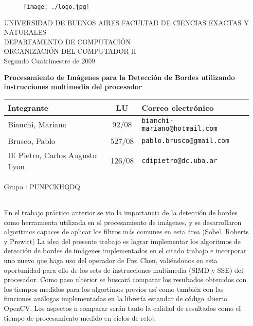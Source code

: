 \documentclass[11pt, a4paper]{article}
\begin{document}
\begin{figure}[t] %
\centering
\texttt{[image: ./logo.jpg]}
\end{figure}


\begin{center}


\LARGE{UNIVERSIDAD DE BUENOS AIRES}
\Large{FACULTAD DE CIENCIAS EXACTAS Y NATURALES\\
DEPARTAMENTO DE COMPUTACI\'ON\\
\vspace{1.5cm}
ORGANIZACI\'ON DEL COMPUTADOR II\\
Segundo Cuatrimestre de 2009}

\vskip 50pt
\textbf{\Large{Procesamiento de Im\'agenes para la Detecci\'on de Bordes utilizando instrucciones multimedia del procesador}}

\end{center}

\vskip 30pt

\begin{center}
\begin{tabular}{|lcl|}
\hline Integrante & LU & Correo electr\'onico \\
\hline Bianchi, Mariano & 92/08 & \texttt{bianchi-mariano@hotmail.com}\\
Brusco, Pablo & 527/08 & \texttt{pablo.brusco@gmail.com} \\
Di Pietro, Carlos Augusto Lyon & 126/08 & \texttt{cdipietro@dc.uba.ar}\\
\hline
\end{tabular}

\vspace{20 pt}

Grupo : PUNPCKHQDQ

\end{center}

\vskip 15pt

{\small\textbf{}\\
En el trabajo pr\'actico anterior se vio la importancia de la detecci\'on de bordes como herramienta utilizada en el procesamiento de im\'agenes, y se desarrollaron algoritmos capaces de aplicar los filtros m\'as comunes en esta \'area (Sobel, Roberts y Prewitt)
La idea del presente trabajo es lograr implementar los algoritmos de detecci\'on de bordes de im\'agenes implementados en el citado trabajo e incorporar uno nuevo que haga uso del operador de Frei Chen, vali\'endonos en esta oportunidad  para ello de los sets de instrucciones multimedia (SIMD y SSE) del procesador. 
Como paso ulterior se buscar\'a comparar los resultados obtenidos con los tiempos medidos para los algortimos previos as\'i como tambi\'en con las funciones an\'alogas implementadas en la librer\'ia estandar de c\'odigo abierto OpenCV. Los aspectos a comparar ser\'an tanto la calidad de resultados como el tiempo de
procesamiento medido en ciclos de reloj.}\\
\end{document}
